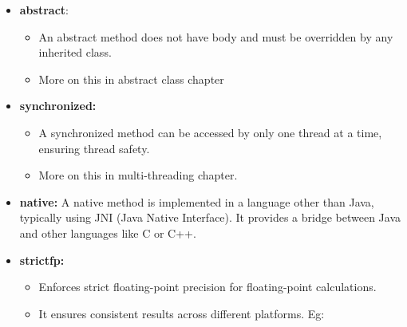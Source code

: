 \begin{flushleft}
\begin{itemize}
		\newpage
		\item \textbf{abstract}:
		\begin{itemize}
			\item An abstract method does not have body and must be overridden by any inherited class.
			\item More on this in abstract class chapter
		\end{itemize}
		\bigskip
		\item \textbf{synchronized:}
		\begin{itemize}
			\item A synchronized method can be accessed by only one thread at a time, ensuring thread safety.
			\item More on this in multi-threading chapter.
		\end{itemize}
		\bigskip
		\item \textbf{native:} A native method is implemented in a language other than Java, typically using JNI (Java Native Interface). It provides a bridge between Java and other languages like C or C++.
		\bigskip
		\item \textbf{strictfp:} 
		\begin{itemize}
			\item Enforces strict floating-point precision for floating-point calculations. 
			\item It ensures consistent results across different platforms. Eg:
			\bigskip
			\bigskip
			
		\end{itemize}
	
	\end{itemize}
	
	\newpage
	

\end{flushleft}
